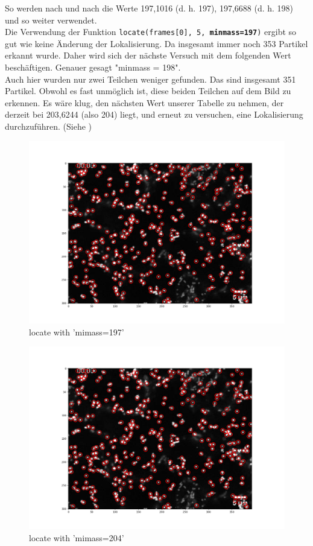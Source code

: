 \begin{enumerate}
So werden nach und nach die Werte 197,1016 (d. h. 197), 197,6688 (d. h. 198) und so weiter verwendet.\\
Die Verwendung der Funktion \texttt{locate(frames[0], 5, \textbf{minmass=197})} ergibt so gut wie keine Änderung der Lokalisierung. Da insgesamt immer noch 353 Partikel  erkannt wurde. Daher wird sich der nächste Versuch mit dem folgenden Wert beschäftigen. Genauer gesagt "minmass = 198". \\
Auch hier wurden nur zwei Teilchen weniger gefunden. Das sind insgesamt 351 Partikel. Obwohl es fast unmöglich ist, diese beiden Teilchen auf dem Bild zu erkennen. 
Es wäre klug, den nächsten Wert unserer Tabelle zu nehmen, der derzeit bei 203,6244 (also 204) liegt, und erneut zu versuchen, eine Lokalisierung durchzuführen. (Siehe )

\begin{figure}[H]
    \centering
    \includegraphics[scale=0.35]{Grafiken/trackpyBilder/locate_with_minmass_02.png}
    \caption{locate with 'mimass=197'}
\end{figure}


\begin{figure}[H]
    \centering
    \includegraphics[scale=0.35]{Grafiken/trackpyBilder/locate_with_minmass_04(204).png}
    \caption{locate with 'mimass=204'}
\end{figure}


\end{enumerate}
